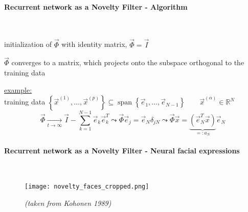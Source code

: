 \paragraph{Recurrent network as a Novelty Filter - Algorithm}\mbox{}\\
\begin{algorithm}[H]
		\DontPrintSemicolon
		initialization of $\vec{\Phi}$ with identity matrix, $\vec{\Phi} = \vec{I}$\;
	\end{algorithm}

	\begin{itemize}
		\itl $\vec{\Phi}$ converges to a matrix, which projects onto the subspace orthogonal to the training data
	\end{itemize}

	\underline{example:}\\
	training data $\left\{ \vec{x}^{(1)}, \dots, \vec{x}^{(p)} \right\} \subseteq \operatorname{span}\left\{ \vec{e}_1, \dots, \vec{e}_{N-1} \right\} \qquad \vec{x}^{(\alpha)} \in \mathbb{R}^N$
	\vspace{-0.2cm}
	\begin{equation*}
		\vec{\Phi} \xrightarrow[t \to \infty]{} \vec{I} - \sum_{k=1}^{N-1} \vec{e}_k \vec{e}_k^T \leadsto \vec{\Phi} \vec{e}_j = \vec{e}_N \delta_{jN} \leadsto \vec{\Phi} \vec{x} = \underbrace{\left( \vec{e}_N^T \vec{x} \right)}_{=: a_N} \vec{e}_N
	\end{equation*}

\paragraph{Recurrent network as a Novelty Filter - Neural facial expressions}\mbox{}\\
\begin{figure}[h]
		\centering
			\texttt{[image: novelty\_faces\_cropped.png]}
		\caption*{\hspace{5cm} \textit{(taken from Kohonen 1989)}}
	\end{figure}

